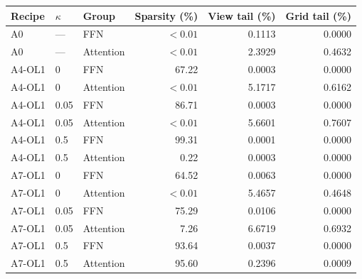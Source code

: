 \begin{tabular}{@{}lllrrr@{}}
\toprule
Recipe & $\kappa$ & Group & Sparsity (\%) & View tail (\%) & Grid tail (\%) \\
\midrule
A0 & --- & FFN & $<0.01$ & 0.1113 & 0.0000 \\
A0 & --- & Attention & $<0.01$ & 2.3929 & 0.4632 \\
A4-OL1 & 0 & FFN & 67.22 & 0.0003 & 0.0000 \\
A4-OL1 & 0 & Attention & $<0.01$ & 5.1717 & 0.6162 \\
A4-OL1 & 0.05 & FFN & 86.71 & 0.0003 & 0.0000 \\
A4-OL1 & 0.05 & Attention & $<0.01$ & 5.6601 & 0.7607 \\
A4-OL1 & 0.5 & FFN & 99.31 & 0.0001 & 0.0000 \\
A4-OL1 & 0.5 & Attention & 0.22 & 0.0003 & 0.0000 \\
A7-OL1 & 0 & FFN & 64.52 & 0.0063 & 0.0000 \\
A7-OL1 & 0 & Attention & $<0.01$ & 5.4657 & 0.4648 \\
A7-OL1 & 0.05 & FFN & 75.29 & 0.0106 & 0.0000 \\
A7-OL1 & 0.05 & Attention & 7.26 & 6.6719 & 0.6932 \\
A7-OL1 & 0.5 & FFN & 93.64 & 0.0037 & 0.0000 \\
A7-OL1 & 0.5 & Attention & 95.60 & 0.2396 & 0.0009 \\
\bottomrule
\end{tabular}
